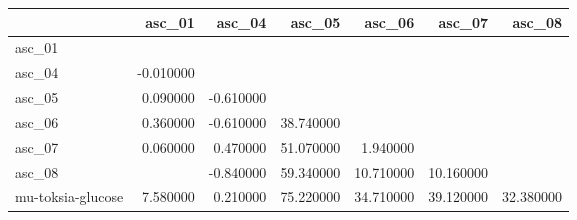 \begin{tabular}{lrrrrrr}
\toprule
 & asc_01 & asc_04 & asc_05 & asc_06 & asc_07 & asc_08 \\
\midrule
asc_01 &  &  &  &  &  &  \\
asc_04 & -0.010000 &  &  &  &  &  \\
asc_05 & 0.090000 & -0.610000 &  &  &  &  \\
asc_06 & 0.360000 & -0.610000 & 38.740000 &  &  &  \\
asc_07 & 0.060000 & 0.470000 & 51.070000 & 1.940000 &  &  \\
asc_08 &  & -0.840000 & 59.340000 & 10.710000 & 10.160000 &  \\
mu-toksia-glucose & 7.580000 & 0.210000 & 75.220000 & 34.710000 & 39.120000 & 32.380000 \\
\bottomrule
\end{tabular}
